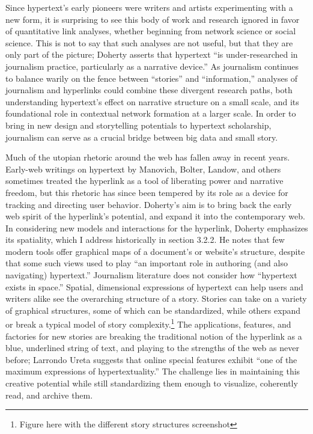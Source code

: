Since hypertext's early pioneers were writers and artists experimenting with a new form, it is surprising to see this body of work and research ignored in favor of quantitative link analyses, whether beginning from network science or social science. This is not to say that such analyses are not useful, but that they are only part of the picture; Doherty asserts that hypertext ``is under-researched in journalism practice, particularly as a narrative device.''\autocite[124]{doherty_hypertext_2014} As journalism continues to balance warily on the fence between ``stories'' and ``information,'' analyses of journalism and hyperlinks could combine these divergent research paths, both understanding hypertext's effect on narrative structure on a small scale, and its foundational role in contextual network formation at a larger scale. In order to bring in new design and storytelling potentials to hypertext scholarship, journalism can serve as a crucial bridge between big data and small story.

Much of the utopian rhetoric around the web has fallen away in recent years. Early-web writings on hypertext by Manovich, Bolter, Landow, and others sometimes treated the hyperlink as a tool of liberating power and narrative freedom, but this rhetoric has since been tempered by its role as a device for tracking and directing user behavior. Doherty's aim is to bring back the early web spirit of the hyperlink's potential, and expand it into the contemporary web. In considering new models and interactions for the hyperlink, Doherty emphasizes its spatiality, which I address historically in section 3.2.2. He notes that few modern tools offer graphical maps of a document's or website's structure, despite that some such views used to play ``an important role in authoring (and also navigating) hypertext.''\autocite{doherty_hypertext_2013} Journalism literature does not consider how ``hypertext exists in space.''\autocite{doherty_hypertext_2013} Spatial, dimensional expressions of hypertext can help users and writers alike see the overarching structure of a story. Stories can take on a variety of graphical structures, some of which can be standardized, while others expand or break a typical model of story complexity.\footnote{Figure here with the different story structures screenshot} The applications, features, and factories for new stories are breaking the traditional notion of the hyperlink as a blue, underlined string of text, and playing to the strengths of the web as never before; Larrondo Ureta suggests that online special features exhibit ``one of the maximum expressions of hypertextuality.''\autocite{doherty_hypertext_2014,ureta_potential_2011} The challenge lies in maintaining this creative potential while still standardizing them enough to visualize, coherently read, and archive them.

